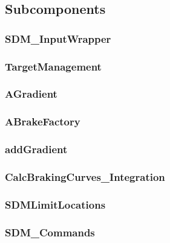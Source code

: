 \subsection{Subcomponents}\label{s:SDM_subcomponents}

\subsubsection{SDM\_InputWrapper}


\subsubsection{TargetManagement}


\subsubsection{AGradient}


\subsubsection{ABrakeFactory}


\subsubsection{addGradient}


\subsubsection{CalcBrakingCurves\_Integration}


\subsubsection{SDMLimitLocations}


%
%
%
%
\subsubsection{SDM\_Commands}


%
%